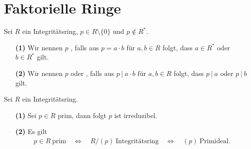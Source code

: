 \section{Faktorielle Ringe}

\begin{df}\label{skript:9.1}
	Sei $R$ ein Integritätsring, $p \in R \setminus \lbrace 0 \rbrace$ und $p \notin R^\ast$.
	
	\begin{enumerate}
		\item[\textbf{(1)}]
		Wir nennen $p$ ,
		falls aus $p = a \cdot b$ für $a,b \in R$ folgt,
		dass $a \in R^\ast $ oder $b \in R^\ast$ gilt.
		
		\item[\textbf{(2)}]
		Wir nennen $p$  oder ,
		falls aus $p \ | \ a \cdot b$ für $a,b \in R$ folgt,
		dass $p \ | \ a$ oder $p \ | \ b$ gilt.
	\end{enumerate}
\end{df}

\begin{lemma}\label{skript:9.2}
	Sei $R$ ein Integritätsring.
	\begin{enumerate}
		\item[\textbf{(1)}]
		Sei $p \in R$ prim, dann folgt $p$ ist irreduzibel.
		
		\item[\textbf{(2)}]
		Es gilt
		\begin{align*}
		p \in R \ \text{prim}
		\quad \Leftrightarrow \quad
		R/ (p) \ \text{Integritätsring} 
		\quad \Leftrightarrow \quad
		(p) \ \text{Primideal}.
		\end{align*}				
	\end{enumerate}
\end{lemma}

